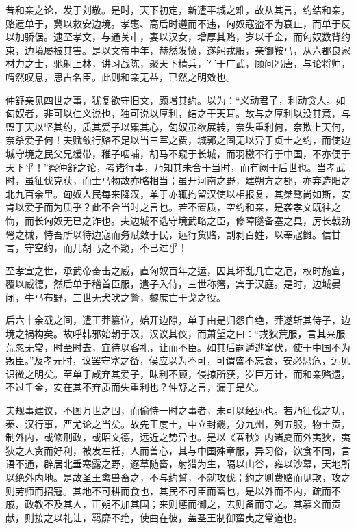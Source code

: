 \documentclass[12pt,UTF8]{ctexbook}
\begin{document}
昔和亲之论，发于刘敬。是时，天下初定，新遭平城之难，故从其言，约结和亲，赂遗单于，冀以救安边境。孝惠、高后时遵而不违，匈奴寇盗不为衰止，而单于反以加骄倨。逮至孝文，与通关市，妻以汉女，增厚其赂，岁以千金，而匈奴数背约束，边境屡被其害。是以文帝中年，赫然发愤，遂躬戎服，亲御鞍马，从六郡良家材力之士，驰射上林，讲习战陈，聚天下精兵，军于广武，顾问冯唐，与论将帅，喟然叹息，思古名臣。此则和亲无益，已然之明效也。



仲舒亲见四世之事，犹复欲守旧文，颇增其约。以为：“义动君子，利动贪人。如匈奴者，非可以仁义说也，独可说以厚利，结之于天耳。故与之厚利以没其意，与盟于天以坚其约，质其爱子以累其心，匈奴虽欲展转，奈失重利何，奈欺上天何，奈杀爱子何！夫赋敛行赂不足以当三军之费，城郭之固无以异于贞士之约，而使边城守境之民父兄缓带，稚子咽哺，胡马不窥于长城，而羽檄不行于中国，不亦便于天下乎！”察仲舒之论，考诸行事，乃知其未合于当时，而有阙于后世也。当孝武时，虽征伐克获，而士马物故亦略相当；虽开河南之野，建朔方之郡，亦弃造阳之北九百余里。匈奴人民每来降汉，单于亦辄拘留汉使以相报复，其桀骜尚如斯，安肯以爱子而为质乎？此不合当时之言也。若不置质，空约和亲，是袭孝文既往之悔，而长匈奴无已之诈也。夫边城不选守境武略之臣，修障隧备塞之具，厉长戟劲弩之械，恃吾所以待边寇而务赋敛于民，远行货赂，割剥百姓，以奉寇雠。信甘言，守空约，而几胡马之不窥，不已过乎！



至孝宣之世，承武帝奋击之威，直匈奴百年之运，因其坏乱几亡之厄，权时施宜，覆以威德，然后单于稽首臣服，遣子入侍，三世称籓，宾于汉庭。是时，边城晏闭，牛马布野，三世无犬吠之警，黎庶亡干戈之役。



后六十余载之间，遭王莽篡位，始开边隙，单于由是归怨自绝，莽遂斩其侍子，边境之祸构矣。故呼韩邪始朝于汉，汉议其仪，而萧望之曰：“戎狄荒服，言其来服荒忽无常，时至时去，宜待以客礼，让而不臣。如其后嗣遁逃窜伏，使于中国不为叛臣。”及孝元时，议罢守塞之备，侯应以为不可，可谓盛不忘衰，安必思危，远见识微之明矣。至单于咸弃其爱子，昧利不顾，侵掠所获，岁巨万计，而和亲赂遗，不过千金，安在其不弃质而失重利也？仲舒之言，漏于是矣。



夫规事建议，不图万世之固，而偷恃一时之事者，未可以经远也。若乃征伐之功，秦、汉行事，严尤论之当矣。故先王度土，中立封畿，分九州，列五服，物土贡，制外内，或修刑政，或昭文德，远近之势异也。是以《春秋》内诸夏而外夷狄，夷狄之人贪而好利，被发左衽，人而兽心，其与中国殊章服，异习俗，饮食不同，言语不通，辟居北垂寒露之野，逐草随畜，射猎为生，隔以山谷，雍以沙幕，天地所以绝外内地。是故圣王禽兽畜之，不与约誓，不就攻伐；约之则费赂而见欺，攻之则劳师而招寇。其地不可耕而食也，其民不可臣而畜也，是以外而不内，疏而不戚，政教不及其人，正朔不加其国；来则惩而御之，去则备而守之。其慕义而贡献，则接之以礼让，羁靡不绝，使曲在彼，盖圣王制御蛮夷之常道也。
\end{document}
